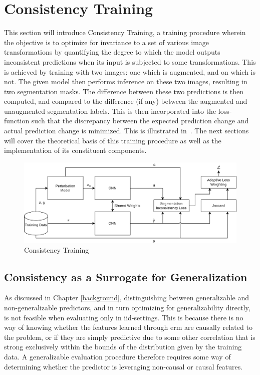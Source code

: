 \section{Consistency Training}
This section will introduce Consistency Training, a training procedure wherein the objective is to optimize for invariance to a set of various image transformations by quantifying the degree to which the model outputs inconsistent predictions when its input is subjected to some transformations. This is achieved by training with two images: one which is augmented, and on which is not. The given model then performs inference on these two images, resulting in two segmentation masks. The difference between these two predictions is then computed, and compared to the difference (if any) between the augmented and unaugmented segmentation labels. This is then incorporated into the loss-function such that the discrepancy between the expected prediction change and actual prediction change is minimized. This is illustrated in~. The next sections will cover the theoretical basis of this training procedure as well as the implementation of its constituent components.  

\begin{figure}[htb]
    \centering
    \includegraphics[width=\linewidth]{illustrations/consistency_training.png}
    \caption{Consistency Training}
    \label{fig:consistency_training}
\end{figure}


\subsection{Consistency as a Surrogate for Generalization}\label{consistency_conceptual}
As discussed in Chapter \ref{background}, distinguishing between generalizable and non-generalizable predictors, and in turn optimizing for generalizability directly, is not feasible when evaluating only in iid-settings. This is because there is no way of knowing whether the features learned through \gls{erm} are causally related to the problem, or if they are simply predictive due to some other correlation that is strong exclusively within the bounds of the distribution given by the training data. A generalizable evaluation procedure therefore requires some way of determining whether the predictor is leveraging non-causal or causal features. 

